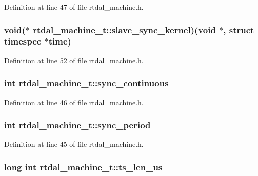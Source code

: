 Definition at line 47 of file rtdal\-\_\-machine.\-h.

\hypertarget{structrtdal__machine__t_ae38315c451db255d9108192ab2fbfe3d}{
\subsubsection[{slave\-\_\-sync\-\_\-kernel}]{\setlength{\rightskip}{0pt plus 5cm}void($\ast$ rtdal\-\_\-machine\-\_\-t\-::slave\-\_\-sync\-\_\-kernel)(void $\ast$, struct timespec $\ast$time)}}\label{structrtdal__machine__t_ae38315c451db255d9108192ab2fbfe3d}


Definition at line 52 of file rtdal\-\_\-machine.\-h.

\hypertarget{structrtdal__machine__t_a719bd75d0aa289f72a479c0346c6298b}{
\subsubsection[{sync\-\_\-continuous}]{\setlength{\rightskip}{0pt plus 5cm}int rtdal\-\_\-machine\-\_\-t\-::sync\-\_\-continuous}}\label{structrtdal__machine__t_a719bd75d0aa289f72a479c0346c6298b}


Definition at line 46 of file rtdal\-\_\-machine.\-h.

\hypertarget{structrtdal__machine__t_a885449f1af2671677597b5b18cd05060}{
\subsubsection[{sync\-\_\-period}]{\setlength{\rightskip}{0pt plus 5cm}int rtdal\-\_\-machine\-\_\-t\-::sync\-\_\-period}}\label{structrtdal__machine__t_a885449f1af2671677597b5b18cd05060}


Definition at line 45 of file rtdal\-\_\-machine.\-h.

\hypertarget{structrtdal__machine__t_a3936ac0026875f5c55dee7beb42f851c}{
\subsubsection[{ts\-\_\-len\-\_\-us}]{\setlength{\rightskip}{0pt plus 5cm}long int rtdal\-\_\-machine\-\_\-t\-::ts\-\_\-len\-\_\-us}}\label{structrtdal__machine__t_a3936ac0026875f5c55dee7beb42f851c}


